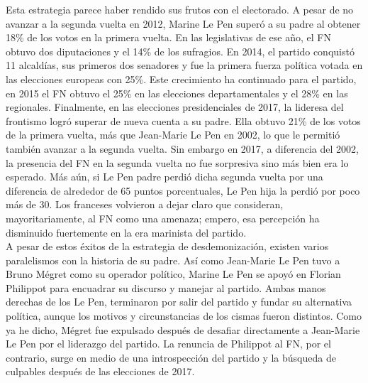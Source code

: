 Esta estrategia parece haber rendido sus frutos con el electorado. A pesar de no avanzar a la segunda vuelta en 2012, Marine Le Pen superó a su padre al obtener 18\% de los votos en la primera vuelta. En las legislativas de ese año, el FN obtuvo dos diputaciones y el 14\% de los sufragios. En 2014, el partido conquistó 11 alcaldías, sus primeros dos senadores y fue la primera fuerza política votada en las elecciones europeas con 25\%. Este crecimiento ha continuado para el partido, en 2015 el FN obtuvo el 25\% en las elecciones departamentales y el 28\% en las regionales. Finalmente, en las elecciones presidenciales de 2017, la lideresa del frontismo logró superar de nueva cuenta a su padre. Ella obtuvo 21\% de los votos de la primera vuelta, más que Jean-Marie Le Pen en 2002, lo que le permitió también avanzar a la segunda vuelta. Sin embargo en 2017, a diferencia del 2002, la presencia del FN en la segunda vuelta no fue sorpresiva sino más bien era lo esperado. Más aún, si Le Pen padre perdió dicha segunda vuelta por una diferencia de alrededor de 65 puntos porcentuales, Le Pen hija la perdió por poco más de 30. Los franceses volvieron a dejar claro que consideran, mayoritariamente, al FN como una amenaza; empero, esa percepción ha disminuido fuertemente en la era marinista del partido.\\

A pesar de estos éxitos de la estrategia de desdemonización, existen varios paralelismos con la historia de su padre. Así como Jean-Marie Le Pen tuvo a Bruno Mégret como su operador político, Marine Le Pen se apoyó en Florian Philippot para encuadrar su discurso y manejar al partido. Ambas manos derechas de los Le Pen, terminaron por salir del partido y fundar su alternativa política, aunque los motivos y circunstancias de los cismas fueron distintos. Como ya he dicho, Mégret fue expulsado después de desafiar directamente a Jean-Marie Le Pen por el liderazgo del partido. La renuncia de Philippot al FN, por el contrario, surge en medio de una introspección del partido y la búsqueda de culpables después de las elecciones de 2017.\\ 

